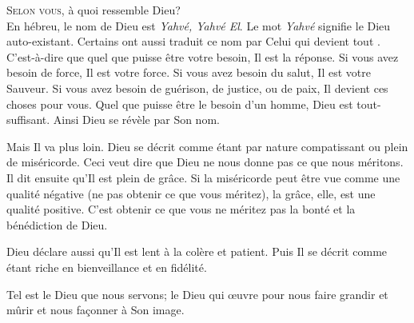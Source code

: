 \lettrine{S}{elon vous}, à quoi ressemble Dieu? \\[1ex]
En hébreu, le nom de Dieu est \emph{Yahvé, Yahvé El}.
 Le mot \emph{Yahvé} signifie le Dieu auto-existant.
 Certains ont aussi traduit ce nom par \Og Celui qui devient tout \Fg{}.
 C'est-à-dire que quel que puisse être votre besoin, Il est la réponse.
 Si vous avez besoin de force, Il est votre force.
 Si vous avez besoin du salut, Il est votre Sauveur.
 Si vous avez besoin de guérison, de justice, ou de paix,
 Il devient ces choses pour vous.
 Quel que puisse être le besoin d'un homme, Dieu est tout-suffisant.
 Ainsi Dieu se révèle par Son nom.

Mais Il va plus loin. Dieu se décrit comme étant par nature compatissant
 ou plein de miséricorde. Ceci veut dire que Dieu ne nous donne pas
 ce que nous méritons.
 Il dit ensuite qu'Il est plein de grâce.
 Si la miséricorde peut être vue comme une qualité négative
 (ne pas obtenir ce que vous méritez), la grâce, elle, est une qualité positive.
 C'est obtenir ce que vous ne méritez pas
 \ocadr{}la bonté et la bénédiction de Dieu.

Dieu déclare aussi qu'Il est lent à la colère et patient.
 Puis Il se décrit comme étant riche en bienveillance et en fidélité.


Tel est le Dieu que nous servons; le Dieu qui \oe{}uvre pour nous faire grandir
 et mûrir et nous fa\c{c}onner à Son image. 

\dvrule








